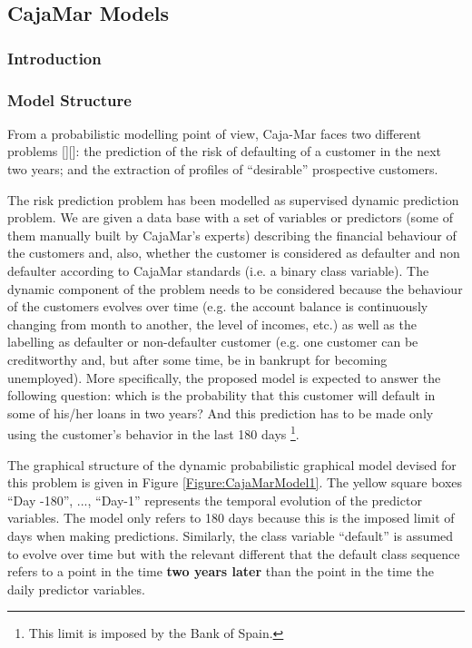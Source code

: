 \subsection{CajaMar Models}
\label{Section:CajaMarModels}

\subsubsection*{Introduction}


\subsubsection*{Model Structure}

From a probabilistic modelling point of view, Caja-Mar faces two different problems [][]: the prediction of the risk of defaulting of a customer in the next two years; and the extraction of profiles of ``desirable'' prospective customers. 

The risk prediction problem has been modelled as supervised dynamic prediction problem.  We are given a data base with a set of variables or predictors (some of them manually built by CajaMar's experts) describing the financial behaviour of the customers and, also, whether the customer is considered as defaulter and non defaulter according to CajaMar standards (i.e. a binary class variable). The dynamic component of the problem needs to be considered because the behaviour of the customers evolves over time (e.g. the account balance is continuously changing from month to another, the level of incomes, etc.)  as well as the labelling as defaulter or non-defaulter customer (e.g. one customer can be creditworthy and, but after some time, be in bankrupt for becoming unemployed). More specifically, the proposed model is expected to answer the following question: which is the probability that this customer will  default in some of his/her loans in two years? And this prediction has to be made only using the customer's behavior in the last 180 days \footnote{This limit is imposed by the Bank of Spain.}.

The graphical structure of the dynamic probabilistic graphical model devised for this problem is given in Figure \ref{Figure:CajaMarModel1}.  The yellow square boxes ``Day -180'', ..., ``Day-1'' represents the temporal evolution of the predictor variables. The model only refers to 180 days because this is the imposed limit of days when making predictions. Similarly, the class variable ``default'' is assumed to evolve over time but with the relevant different that the default class sequence refers to a point in the time \textbf{two years later} than  the point in the time the daily predictor variables. 

